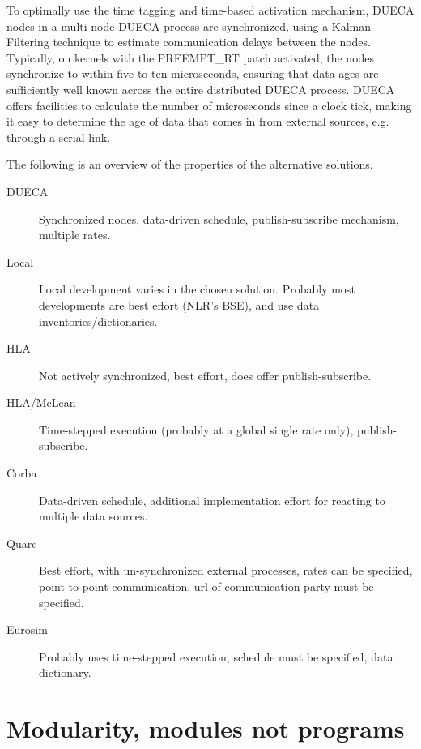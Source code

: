 \documentclass[11pt,a4paper,twoside]{scrreprt}
\begin{document}
To optimally use the time tagging and time-based activation mechanism, DUECA nodes in a multi-node DUECA process are synchronized, using a Kalman Filtering technique to estimate communication delays between the nodes. Typically, on kernels with the PREEMPT\_RT patch activated, the nodes synchronize to within five to ten microseconds, ensuring that data ages are sufficiently well known across the entire distributed DUECA process. DUECA offers facilities to calculate the number of microseconds since a clock tick, making it easy to determine the age of data that comes in from external sources, e.g. through a serial link.

The following is an overview of the properties of the alternative solutions.

\begin{description}
\item[DUECA] Synchronized nodes, data-driven schedule, publish-subscribe mechanism, multiple rates.
\item[Local] Local development varies in the chosen solution. Probably most developments are best effort (NLR's BSE), and use data inventories/dictionaries.
\item[HLA] Not actively synchronized, best effort, does offer publish-subscribe.
\item[HLA/McLean] Time-stepped execution (probably at a global single rate only), publish-subscribe.
\item[Corba] Data-driven schedule, additional implementation effort for reacting to multiple data sources.
\item[Quarc] Best effort, with un-synchronized external processes, rates can be specified, point-to-point communication, url of communication party must be specified.
\item[Eurosim] Probably uses time-stepped execution, schedule must be specified, data dictionary.
\end{description}

\section{Modularity, modules not programs}
\end{document}
